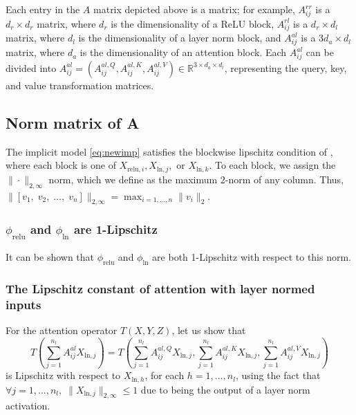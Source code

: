 \documentclass{article}
\begin{document}
Each entry in the $A$ matrix depicted above is a matrix; for example, $A^{rr}_{ij}$ is a $d_r\times d_r$ matrix, where 
$d_r$ is the dimensionality of a ReLU block, $A^{rl}_{ij}$ is a $d_r\times d_l$ matrix, where $d_l$ is the 
dimensionality of a layer norm block, and $A^{al}_{ij}$ is a $3d_a\times d_l$ matrix, where $d_a$ is the dimensionality
of an attention block. Each $A^{al}_{ij}$ can be divided into $A^{al}_{ij} = (A^{al, Q}_{ij}, A^{al, K}_{ij}, A^{al, V}_{ij})
\in \mathbb R^{3\times d_a\times d_l}$, representing the query, key, and value transformation matrices.
\subsection{Norm matrix of \texorpdfstring{A}{}}
The implicit model \eqref{eq:newimp} satisfies the blockwise lipschitz condition of \citep{idl2019}, where each block is
one of $X_{\text{relu}, i}, X_{\text{ln},j},$ or $X_{\text{ln}, k}$. To each block, we assign the $\|\cdot\|_{2,\infty}$ 
norm, which we define as the maximum 2-norm of any column. Thus, $\|[v_1,\; v_2,\;\ldots,\;v_n]\|_{2,\infty} = 
\max_{i=1,\ldots,n}\|v_i\|_2$.
\subsubsection{\texorpdfstring{$\phi_\text{relu}$}{} and \texorpdfstring{$\phi_\text{ln}$}{} are 1-Lipschitz}
It can be shown that $\phi_\text{relu}$ and $\phi_\text{ln}$ are both 1-Lipschitz with respect to this norm. 
\subsubsection{The Lipschitz constant of attention with layer normed inputs}
For the attention operator $T(X, Y, Z)$, let us show that 
\begin{equation*}
  T\left(\sum_{j=1}^{n_l} A^{al}_{ij} X_{\text{ln}, j}\right) = T\left(\sum_{j=1}^{n_l} A^{al, Q}_{ij} X_{\text{ln}, j},
  \sum_{j=1}^{n_l} A^{al, K}_{ij} X_{\text{ln}, j}, \sum_{j=1}^{n_l} A^{al, V}_{ij} X_{\text{ln}, j}\right)
\end{equation*}
is Lipschitz with respect to $X_{\text{ln}, h}$, for each $h=1,\ldots, n_l$,
using the fact that $\forall j=1,\ldots, n_l,\;\|X_{\text{ln}, j}\|_{2,\infty} \leq 1$ due to
being the output of a layer norm activation.
\end{document}
